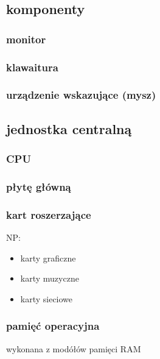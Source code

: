 \documentclass[11pt]{article}
\begin{document}
\subsection{komponenty}
\label{sec:org38dd8cc}
\subsubsection{monitor}
\label{sec:orgd17578c}
\subsubsection{klawaitura}
\label{sec:orgb3251d5}
\subsubsection{urządzenie wskazujące (mysz)}
\label{sec:org02a3b24}
\subsection{jednostka centralną}
\label{sec:orgc8a3677}
\subsubsection{CPU}
\label{sec:orgfcc519b}
\subsubsection{płytę główną}
\label{sec:org36ae1ff}
\subsubsection{kart roszerzające}
\label{sec:org209b015}
NP:
\begin{itemize}
\item karty graficzne
\item karty muzyczne
\item karty sieciowe
\end{itemize}
\subsubsection{pamięć operacyjna}
\label{sec:orgeb7fb7e}
wykonana z modółów pamięci RAM
\end{document}
